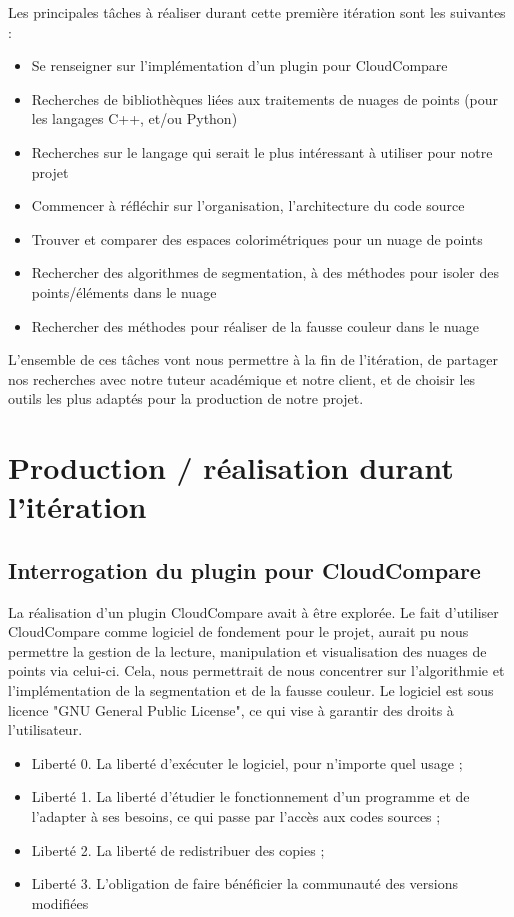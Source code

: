 \documentclass[12pt,titlepage,french]{article}
\begin{document}
Les principales tâches à réaliser durant cette première itération sont les suivantes :
\begin{itemize}
  \item Se renseigner sur l'implémentation d'un plugin pour CloudCompare
  \item Recherches de bibliothèques liées aux traitements de nuages de points (pour les langages C++, et/ou Python)
  \item Recherches sur le langage qui serait le plus intéressant à utiliser pour notre projet
  \item Commencer à réfléchir sur l'organisation, l'architecture du code source
  \item Trouver et comparer des espaces colorimétriques pour un nuage de points
  \item Rechercher des algorithmes de segmentation, à des méthodes pour isoler des points/éléments dans le nuage
  \item Rechercher des méthodes pour réaliser de la fausse couleur dans le nuage
\end{itemize}

L'ensemble de ces tâches vont nous permettre à la fin de l'itération, de partager nos recherches avec notre tuteur académique et notre client, et de choisir les outils les plus adaptés pour la production de notre projet.

\section{Production / réalisation durant l'itération}

\subsection{Interrogation du plugin pour CloudCompare}

La réalisation d'un plugin CloudCompare avait à être explorée. Le fait d'utiliser CloudCompare comme logiciel de fondement pour le projet, aurait pu nous permettre la gestion de la lecture, manipulation et visualisation des nuages de points via celui-ci. Cela, nous permettrait de nous concentrer sur l'algorithmie et l'implémentation de la segmentation et de la fausse couleur.
Le logiciel est sous licence "GNU General Public License", ce qui vise à garantir des droits à l'utilisateur.
\begin{itemize}
\item Liberté 0. La liberté d'exécuter le logiciel, pour n'importe quel usage ;
\item Liberté 1. La liberté d'étudier le fonctionnement d'un programme et de l'adapter à ses besoins, ce qui passe par l'accès aux codes sources ;
\item Liberté 2. La liberté de redistribuer des copies ;
\item Liberté 3. L'obligation de faire bénéficier la communauté des versions modifiées
\end{itemize}
\end{document}
